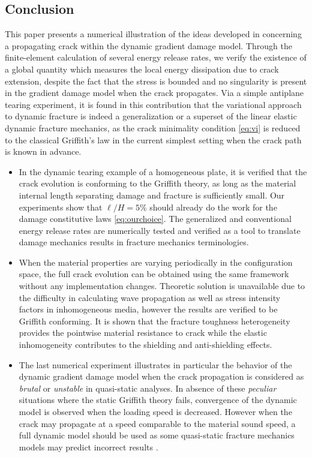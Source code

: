 \subsection{Conclusion} \label{sec:conclusion}
This paper presents a numerical illustration of the ideas developed in \cite{LiMarigo:2015} concerning a propagating crack within the dynamic gradient damage model. Through the finite-element calculation of several energy release rates, we verify the existence of a global quantity which measures the local energy dissipation due to crack extension, despite the fact that the stress is bounded and no singularity is present in the gradient damage model when the crack propagates. Via a simple antiplane tearing experiment, it is found in this contribution that the variational approach to dynamic fracture is indeed a generalization or a superset of the linear elastic dynamic fracture mechanics, as the crack minimality condition \eqref{eq:vi} is reduced to the classical Griffith's law in the current simplest setting when the crack path is known in advance.
\begin{itemize}
\item In the dynamic tearing example of a homogeneous plate, it is verified that the crack evolution is conforming to the Griffith theory, as long as the material internal length separating damage and fracture is sufficiently small. Our experiments show that $\ell/H=5\%$ should already do the work for the damage constitutive laws \eqref{eq:ourchoice}. The generalized and conventional energy release rates are numerically tested and verified as a tool to translate damage mechanics results in fracture mechanics terminologies.

\item When the material properties are varying periodically in the configuration space, the full crack evolution can be obtained using the same framework without any implementation changes. Theoretic solution is unavailable due to the difficulty in calculating wave propagation as well as stress intensity factors in inhomogeneous media, however the results are verified to be Griffith conforming. It is shown that the fracture toughness heterogeneity provides the pointwise material resistance to crack while the elastic inhomogeneity contributes to the shielding and anti-shielding effects.

\item The last numerical experiment illustrates in particular the behavior of the dynamic gradient damage model when the crack propagation is considered as \emph{brutal} or \emph{unstable} in quasi-static analyses. In absence of these \emph{peculiar} situations where the static Griffith theory fails, convergence of the dynamic model is observed when the loading speed is decreased. However when the crack may propagate at a speed comparable to the material sound speed, a full dynamic model should be used as some quasi-static fracture mechanics models may predict incorrect results \cite{DumouchelMarigoCharlotte:2008,LazzaroniBargelliniDumouchelMarigo:2012}.
\end{itemize}

